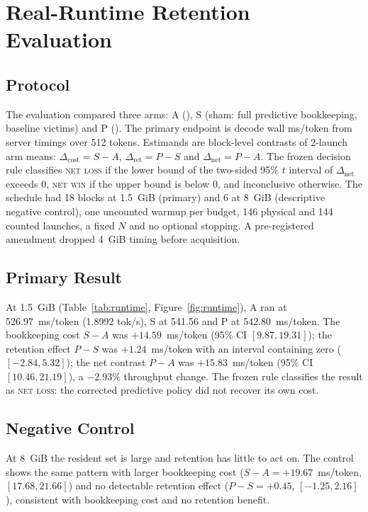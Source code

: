 \documentclass[11pt]{article}
\theoremstyle{plain}
\theoremstyle{definition}
\newcommand{\code}[1]{\texttt{\seqsplit{#1}}}
\begin{document}
\section{Real-Runtime Retention Evaluation}
\label{sec:runtime}

\subsection{Protocol}
The evaluation compared three arms: A (\code{b\_selected}), S (sham: full predictive bookkeeping, baseline victims) and P (\code{predicted\_protect}). The primary endpoint is decode wall ms/token from server timings over 512 tokens. Estimands are block-level contrasts of 2-launch arm means: $\Delta_{\mathrm{cost}} = S-A$, $\Delta_{\mathrm{ret}} = P-S$ and $\Delta_{\mathrm{net}} = P-A$. The frozen decision rule classifies \textsc{net loss} if the lower bound of the two-sided 95\% $t$ interval of $\Delta_{\mathrm{net}}$ exceeds 0, \textsc{net win} if the upper bound is below 0, and inconclusive otherwise. The schedule had 18 blocks at 1.5~GiB (primary) and 6 at 8~GiB (descriptive negative control), one uncounted warmup per budget, 146 physical and 144 counted launches, a fixed $N$ and no optional stopping. A pre-registered amendment dropped 4~GiB timing before acquisition.



\subsection{Primary Result}
At 1.5~GiB (Table~\ref{tab:runtime}, Figure~\ref{fig:runtime}), A ran at 526.97~ms/token (1.8992 tok/s), S at 541.56 and P at 542.80~ms/token. The bookkeeping cost $S-A$ was $+14.59$~ms/token (95\% CI $[9.87, 19.31]$); the retention effect $P-S$ was $+1.24$~ms/token with an interval containing zero ($[-2.84, 5.32]$); the net contrast $P-A$ was $+15.83$~ms/token (95\% CI $[10.46, 21.19]$), a $-2.93\%$ throughput change. The frozen rule classifies the result as \textsc{net loss}: the corrected predictive policy did not recover its own cost.

\subsection{Negative Control}
At 8~GiB the resident set is large and retention has little to act on. The control shows the same pattern with larger bookkeeping cost ($S-A = +19.67$~ms/token, $[17.68, 21.66]$) and no detectable retention effect ($P-S = +0.45$, $[-1.25, 2.16]$), consistent with bookkeeping cost and no retention benefit.
\end{document}
